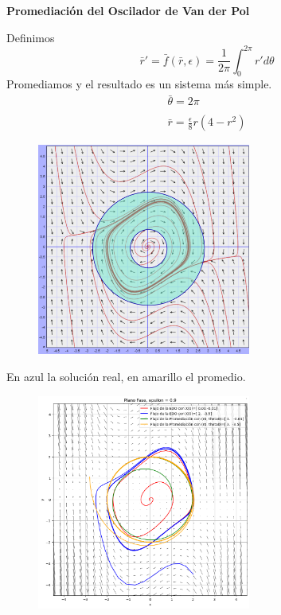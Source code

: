 \documentclass[10pt]{beamer}
\newtheorem{final remarks}{final remarks}[section]
\newtheorem{future work collaboration}{future work collaboration}[section]
\begin{document}

\begin{frame}
    \begin{center}
        \textbf{Promediaci\'on del Oscilador de Van der Pol}
    \end{center}
Definimos
$$\bar{r}'=\bar{f}(\bar{r},\epsilon)=\frac{1}{2\pi}\int_0^{2\pi}r'd\theta$$
Promediamos y el resultado es un sistema m\'as simple.
$$
\begin{matrix}
    \bar{\theta}=2\pi \\
    \\
    \bar{r}=\frac{\epsilon}{8}r(4-r^2)
\end{matrix}
$$

\end{frame}


\begin{frame}
    \begin{figure}[h]
        \centering
        \includegraphics[width=7cm]{Img/vanderpol2.png}
    \end{figure}
\end{frame}

\begin{frame}
    En azul la soluci\'on real, en amarillo el promedio.
    \begin{figure}[h]
		\centering
		\includegraphics[width=7cm]{Img/ejem.png}
	\end{figure}
\end{frame}
\end{document}
